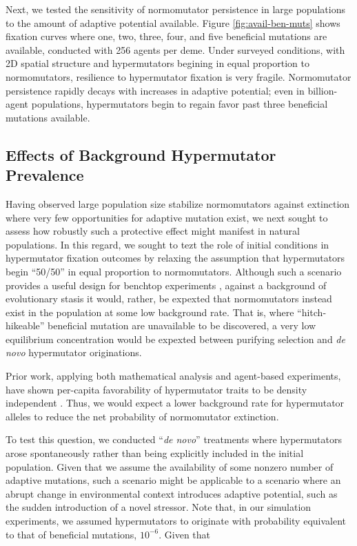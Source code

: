 

Next, we tested the sensitivity of normomutator persistence in large populations to the amount of adaptive potential available.
Figure \ref{fig:avail-ben-muts} shows fixation curves where one, two, three, four, and five beneficial mutations are available, conducted with 256 agents per deme.
Under surveyed conditions, with 2D spatial structure and hypermutators begining in equal proportion to normomutators, resilience to hypermutator fixation is very fragile.
Normomutator persistence rapidly decays with increases in adaptive potential;
even in billion-agent populations, hypermutators begin to regain favor past three beneficial mutations available.

\subsection{Effects of Background Hypermutator Prevalence}
\label{sec:background-hypermutator-prevalence}



Having observed large population size stabilize normomutators against extinction where very few opportunities for adaptive mutation exist, we next sought to assess how robustly such a protective effect might manifest in natural populations.
In this regard, we sought to tezt the role of initial conditions in hypermutator fixation outcomes by relaxing the assumption that hypermutators begin ``50/50'' in equal proportion to normomutators.
Although such a scenario provides a useful design for benchtop experiments \citep{raynes2018sign}, against a background of evolutionary stasis it would, rather, be expexted that normomutators instead exist in the population at some low background rate.
That is, where ``hitch-hikeable'' beneficial mutation are unavailable to be discovered, a very low equilibrium concentration would be expexted between purifying selection and \textit{de novo} hypermutator originations.

Prior work, applying both mathematical analysis and agent-based experiments, have shown per-capita favorability of hypermutator traits to be density independent \citep{raynes2019selection}.
Thus, we would expect a lower background rate for hypermutator alleles to reduce the net probability of normomutator extinction.

To test this question, we conducted ``\textit{de novo}'' treatments where hypermutators arose spontaneously rather than being explicitly included in the initial population.
Given that we assume the availability of some nonzero number of adaptive mutations, such a scenario might be applicable to a scenario where an abrupt change in environmental context introduces adaptive potential, such as the sudden introduction of a novel stressor.
Note that, in our simulation experiments, we assumed hypermutators to originate with probability equivalent to that of beneficial mutations, $10^{-6}$.
Given that

